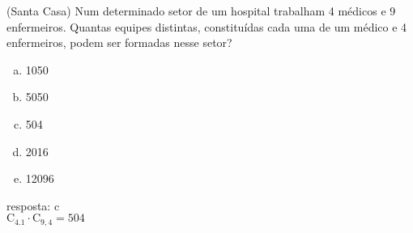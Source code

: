 \begin{ex}
 (Santa Casa) Num determinado setor de um hospital trabalham 4 médicos e 9 enfermeiros. Quantas equipes distintas, constituídas cada uma de um médico e 4 enfermeiros, podem ser formadas nesse setor?
    \begin{enumerate}[(a)]
    \item 1050
    \item 5050
    \item 504
    \item 2016
    \item 12096
    \end{enumerate}
      \begin{sol}
        resposta: c \\
        $\mathrm{C}_{4.1}\cdot\mathrm{C}_{9,4}=504$
      \end{sol}

\end{ex}